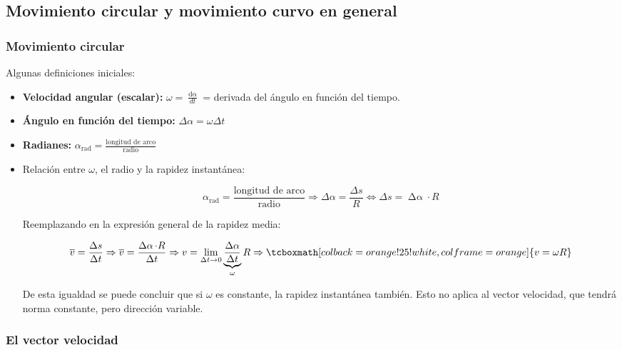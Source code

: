 \documentclass{article}
\begin{document}
\subsection{Movimiento circular y movimiento curvo en general}

\subsubsection{Movimiento circular}

Algunas definiciones iniciales:

\begin{itemize}
\item \textbf{Velocidad angular (escalar):} $\omega = \frac{ \mathop{d\alpha} }{dt}$ = derivada del ángulo en función del tiempo.
\item \textbf{Ángulo en función del tiempo:} $\Delta \alpha = \omega \Delta t$
\item \textbf{Radianes:} $\alpha_{\mathop{rad}} = \frac{\text{longitud de arco}}{ \text{radio} }$
\item Relación entre $\omega$, el radio y la rapidez instantánea:

\begin{equation}
\alpha_{\mathop{rad}} = \frac{\text{longitud de arco}}{ \text{radio} } \Rightarrow \Delta \alpha = \frac{ \Delta s } {R} \Leftrightarrow \Delta s = \mathop{\Delta\alpha} \cdot R
\end{equation}

Reemplazando en la expresión general de la rapidez media:

\begin{equation}
\overline{v} = \frac{\Delta s}{\Delta t} \Rightarrow \overline{v} = \frac{\mathop{\Delta\alpha} \cdot R}{\Delta t} \Rightarrow v = \lim_{\Delta t \rightarrow 0} \underbrace{ \frac{\Delta \alpha}{\Delta t} }_{\omega} R \Rightarrow \tcboxmath[colback=orange!25!white,colframe=orange]
{ v = \omega R }
\end{equation}

De esta igualdad se puede concluir que si $\omega$ es constante, la rapidez instantánea también. Esto no aplica al vector velocidad, que tendrá norma constante, pero dirección variable.
\end{itemize}

\subsubsection{El vector velocidad}
\end{document}

